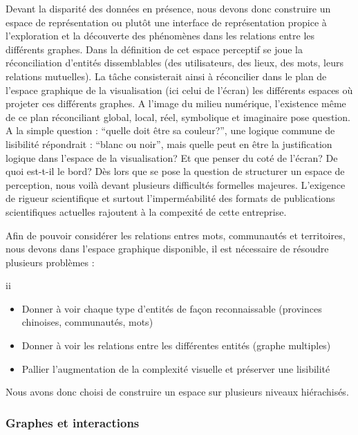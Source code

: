 Devant la disparité des données en présence, nous devons donc
construire un espace de représentation ou plut\^ot une interface de
représentation propice à l{\textquoteright}exploration et la
découverte des phénomènes dans les relations entre les
différents graphes. Dans la définition de cet espace perceptif se
joue la réconciliation d{\textquoteright}entités dissemblables (des
utilisateurs, des lieux, des mots, leurs relations mutuelles). La
t\^ache consisterait ainsi à réconcilier dans le plan de
l{\textquoteright}espace graphique de la visualisation (ici celui de
l{\textquoteright}écran) les différents espaces o\`u projeter ces
différents graphes. A l{\textquoteright}image du milieu numérique,
l{\textquoteright}existence m\^eme de ce plan réconciliant global,
local, réel, symbolique et imaginaire pose question. A la simple
question : {\textquotedblleft}quelle doit \^etre sa
couleur?{\textquotedblright}, une logique commune de lisibilité
répondrait : {\textquotedblleft}blanc ou noir{\textquotedblright},
mais quelle peut en \^etre la justification logique dans
l{\textquoteright}espace de la visualisation? Et que penser du coté
de l{\textquoteright}écran? De quoi est-t-il le bord? Dès lors que
se pose la question de structurer un espace de perception, nous voilà
devant plusieurs difficultés formelles majeures.
L{\textquoteright}exigence de rigueur scientifique et surtout
l{\textquoteright}imperméabilité des formats de publications
scientifiques actuelles rajoutent à la compexité de cette
entreprise.

Afin de pouvoir considérer les relations entres mots, communautés et
territoires, nous devons dans l{\textquoteright}espace graphique
disponible, il est nécessaire de résoudre plusieurs problèmes :

ii
\begin{itemize}
\item Donner à voir chaque type d{\textquoteright}entités de
fa\c{c}on reconnaissable (provinces chinoises, communautés, mots)
\item Donner à voir les relations entre les différentes entités
(graphe multiples)
\item Pallier l{\textquoteright}augmentation de la complexité visuelle
et préserver une lisibilité
\end{itemize}
Nous avons donc choisi de construire un espace sur plusieurs niveaux
hiérachisés.

\subsubsection{Graphes et interactions}

